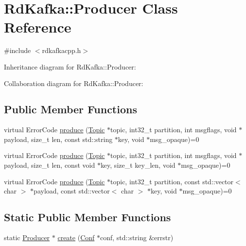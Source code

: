 \hypertarget{classRdKafka_1_1Producer}{\section{Rd\-Kafka\-:\-:Producer Class Reference}
\label{classRdKafka_1_1Producer}
}


{\ttfamily \#include $<$rdkafkacpp.\-h$>$}



Inheritance diagram for Rd\-Kafka\-:\-:Producer\-:


Collaboration diagram for Rd\-Kafka\-:\-:Producer\-:
\subsection*{Public Member Functions}
\begin{DoxyCompactItemize}
\item 
virtual Error\-Code \hyperlink{classRdKafka_1_1Producer_ab90a30c5e5fb006a3b4004dc4c9a7923}{produce} (\hyperlink{classRdKafka_1_1Topic}{Topic} $\ast$topic, int32\-\_\-t partition, int msgflags, void $\ast$payload, size\-\_\-t len, const std\-::string $\ast$key, void $\ast$msg\-\_\-opaque)=0
\item 
virtual Error\-Code \hyperlink{classRdKafka_1_1Producer_a7871c00eb302209acb9ea498eda7dee4}{produce} (\hyperlink{classRdKafka_1_1Topic}{Topic} $\ast$topic, int32\-\_\-t partition, int msgflags, void $\ast$payload, size\-\_\-t len, const void $\ast$key, size\-\_\-t key\-\_\-len, void $\ast$msg\-\_\-opaque)=0
\item 
virtual Error\-Code \hyperlink{classRdKafka_1_1Producer_ac51872fe6252093fc0c271557d132d28}{produce} (\hyperlink{classRdKafka_1_1Topic}{Topic} $\ast$topic, int32\-\_\-t partition, const std\-::vector$<$ char $>$ $\ast$payload, const std\-::vector$<$ char $>$ $\ast$key, void $\ast$msg\-\_\-opaque)=0
\end{DoxyCompactItemize}
\subsection*{Static Public Member Functions}
\begin{DoxyCompactItemize}
\item 
static \hyperlink{classRdKafka_1_1Producer}{Producer} $\ast$ \hyperlink{classRdKafka_1_1Producer_a540569ee0152703cdad4b45419f64b39}{create} (\hyperlink{classRdKafka_1_1Conf}{Conf} $\ast$conf, std\-::string \&errstr)
\end{DoxyCompactItemize}
